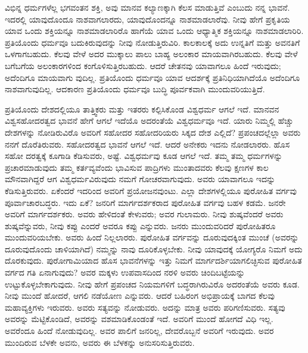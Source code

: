 ವಿಭಿನ್ನ ಧರ್ಮಗಳೆಲ್ಲ ಭಗವಂತನ ಶಕ್ತಿ, ಅವು ಮಾನವ ಕಲ್ಯಾಣಕ್ಕಾಗಿ ಕೆಲಸ ಮಾಡುತ್ತಿವೆ ಎಂಬುದು ನನ್ನ ಭಾವನೆ. ಇದರಲ್ಲಿ ಯಾವುದೊಂದೂ ನಾಶವಾಗಲಾರದು, ಯಾವುದೊಂದನ್ನೂ ನಾಶಮಾಡಲಾರೆವು. ನೀವು ಹೇಗೆ ಪ್ರಕೃತಿಯ ಯಾವ ಒಂದು ಶಕ್ತಿಯನ್ನೂ ನಾಶಮಾಡಲಾರಿರೊ ಹಾಗೆಯೆ ಯಾವ ಒಂದು ಆಧ್ಯಾತ್ಮಿಕ ಶಕ್ತಿಯನ್ನೂ ನಾಶಮಾಡಲಾರಿರಿ. ಪ್ರತಿಯೊಂದು ಧರ್ಮವೂ ಬದುಕಿರುವುದನ್ನು ನೀವು ನೋಡುತ್ತಿರುವಿರಿ. ಕಾಲಕಾಲಕ್ಕೆ ಅದು ಉನ್ನತಿಗೆ ಮತ್ತು ಅವನತಿಗೆ ಒಳಗಾಗಬಹುದು. ಕೆಲವು ವೇಳೆ ಅದರ ಮುಕ್ಕಾಲು ಪಾಲು ಬಾಹ್ಯ ಅಲಂಕಾರ ಮಾಯವಾಗಿರಬಹುದು. ಕೆಲವು ವೇಳೆ ಬಗೆಬಗೆಯ ಅಲಂಕಾರಗಳಿಂದ ಕಂಗೊಳಿಸುತ್ತಿರಬಹುದು. ಆದರೆ ಚೇತನವು ಯಾವಾಗಲೂ ಹಿಂದೆ ಇರುವುದು; ಅದೆಂದಿಗೂ ಮಾಯವಾಗು ವುದಿಲ್ಲ. ಪ್ರತಿಯೊಂದು ಧರ್ಮವೂ ಯಾವ ಆದರ್ಶಕ್ಕೆ ಪ್ರತಿನಿಧಿಯಾಗಿದೆಯೊ ಅದೆಂದಿಗೂ ನಾಶವಾಗುವುದಿಲ್ಲ. ಆದಕಾರಣ ಪ್ರತಿಯೊಂದು ಧರ್ಮವೂ ಬುದ್ಧಿ ಪೂರ್ವಕವಾಗಿ ಮುಂದುವರಿಯುತ್ತಿದೆ.

ಪ್ರತಿಯೊಂದು ದೇಶದಲ್ಲಿಯೂ ತಾತ್ತ್ವಿಕರು ಮತ್ತು ಇತರರು ಕಲ್ಪಿಸಿಕೊಂಡ ವಿಶ್ವಧರ್ಮ ಆಗಲೆ ಇದೆ. ಮಾನವನ ವಿಶ್ವಸಹೋದರತ್ವದ ಭಾವನೆ ಹೇಗೆ ಆಗಲೆ ಇದೆಯೊ ಅದರಂತೆಯೆ ವಿಶ್ವಧರ್ಮವೂ ಇದೆ. ಯಾರು ನಿಮ್ಮಲ್ಲಿ ಹೆಚ್ಚು ದೇಶಗಳನ್ನು ನೋಡಿರುವಿರೊ ಅವರಿಗೆ ಸಹೋದರ ಸಹೋದರಿಯರು ಸಿಕ್ಕದ ದೇಶ ಎಲ್ಲಿದೆ? ಪ್ರಪಂಚದಲ್ಲೆಲ್ಲಾ ಅವರು ನನಗೆ ದೊರೆತಿರುವರು. ಸಹೋದರತ್ವದ ಭಾವನೆ ಆಗಲೆ ಇದೆ. ಆದರೆ ಅನೇಕರು ಇದನು ನೋಡಲಾರರು. ಹೊಸ ಸಹೋ ದರತ್ವಕ್ಕೆ ಕೂಗಾಡಿ ಕೆಡಿಸುವರು, ಅಷ್ಟೆ. ವಿಶ್ವಧರ್ಮವು ಕೂಡ ಆಗಲೆ ಇದೆ. ತಮ್ಮ ತಮ್ಮ ಧರ್ಮಗಳನ್ನು ಪ್ರಚಾರಮಾಡುವುದು ತಮ್ಮ ಕರ್ತವ್ಯವೆಂದು ಭಾವಿಸುವ ಪಾದ್ರಿಗಳು ಮುಂತಾದವರು ಕೆಲವು ಕ್ಷಣಗಳ ಕಾಲ ಮೌನವಾಗಿದ್ದರೆ ಆಗ ವಿಶ್ವಧರ್ಮವಿರುವುದು ನಮಗೆ ಗೋಚರವಾಗುವುದು. ಅವರು ಯಾವಾಗಲೂ ಇದನ್ನು ಕೆಡಿಸುತ್ತಿರುವರು. ಏಕೆಂದರೆ ಇದರಿಂದ ಅವರಿಗೆ ಪ್ರಯೋಜನವುಂಟು. ಎಲ್ಲಾ ದೇಶಗಳಲ್ಲಿಯೂ ಪುರೋಹಿತ ವರ್ಗವು ಪೂರ್ವಾಚಾರಬದ್ಧರು. ಇದು ಏಕೆ? ಜನರಿಗೆ ಮಾರ್ಗದರ್ಶಕರಾದ ಪುರೋಹಿತ ವರ್ಗವು ಬಹಳ ಕಡಮೆ. ಜನರೇ ಅವರಿಗೆ ಮಾರ್ಗದರ್ಶಕರು. ಅವರು ಹೇಳಿದಂತೆ ಕೇಳುವರು; ಅವರ ಗುಲಾಮರು. ನೀವು ಶುಷ್ಕವೆಂದರೆ ಅವರು ಶುಷ್ಕವೆನ್ನುವರು, ನೀವು ಕಪ್ಪು ಎಂದರೆ ಅವರೂ ಕಪ್ಪು ಎನ್ನುವರು. ಜನರು ಮುಂದುವರಿದರೆ ಪುರೋಹಿತರೂ ಮುಂದುವರಿಯಬೇಕು. ಅವರು ಹಿಂದೆ ನಿಲ್ಲಲಾರರು. ಪುರೋಹಿತ ವರ್ಗವನ್ನು ದೂರುವುದಕ್ಕಿಂತ ಮುಂಚೆ (ಅವರನ್ನು ದೂರುವುದೊಂದು ಚಾಳಿಯಾಗಿದೆ) ನಮ್ಮನ್ನು ನಾವು ದೂರಿಕೊಳ್ಳಬೇಕು. ನೀವು ಯಾವುದಕ್ಕೆ ಯೋಗ್ಯರೊ ನಿಮಗೆ ಅದು ದೊರಕುವುದು. ಪುರೋಗಾಮಿಯಾದ ಹೊಸ ಭಾವನೆಗಳನ್ನು ಇತ್ತು ನಿಮಗೆ ಮಾರ್ಗದರ್ಶಿಯಾಗಲಿಚ್ಛಿಸುವ ಪುರೋಹಿತ ವರ್ಗದ ಗತಿ ಏನಾಗುವುದು? ಅವರ ಮಕ್ಕಳು ಉಪವಾಸದಿಂದ ನರಳಿ ಅವರು ಚಿಂದಿಬಟ್ಟೆಯನ್ನು ಉಟ್ಟುಕೊಳ್ಳಬೇಕಾಗುವುದು. ನೀವು ಹೇಗೆ ಪ್ರಪಂಚದ ನಿಯಮಗಳಿಗೆ ಬದ್ಧರಾಗಿರುವಿರೊ ಅದರಂತೆಯೆ ಅವರು ಕೂಡ. ನೀವು ಮುಂದೆ ಹೋದರೆ, ಆಗಲಿ ನಡೆಯೋಣ ಎನ್ನುವರು. ಆದರೆ ಬಹಿರಂಗ ಅಭಿಪ್ರಾಯಕ್ಕೆ ಬಾಗದ ಕೆಲವು ಮಹಾವ್ಯಕ್ತಿಗಳು ಇರುವರು. ಅವರು ಸತ್ಯವನ್ನು ನೋಡುವರು. ಅದನ್ನು ಮಾತ್ರ ಅವರು ಪರಿಗಣಿಸುವರು. ಸತ್ಯವು ಅವರನ್ನು ಮೆಟ್ಟಿಕೊಂಡಿದೆ, ಅವರನ್ನು ವಶಮಾಡಿಕೊಂಡಂತೆ ಇದೆ. ಅವರಿಗೆ ಮುಂದೆ ಹೋಗದೆ ವಿಧಿ ಇಲ್ಲ. ಅವರೆಂದೂ ಹಿಂದೆ ನೋಡುವುದಿಲ್ಲ. ಅವರ ಪಾಲಿಗೆ ಜನರಿಲ್ಲ, ದೇವರೊಬ್ಬನೆ ಅವರಿಗೆ ಇರುವುದು. ಅವರ ಮುಂದಿರುವ ಬೆಳಕೇ ಅವನು, ಅವರು ಈ ಬೆಳಕನ್ನು ಅನುಸರಿಸುತ್ತಿರುವರು.

